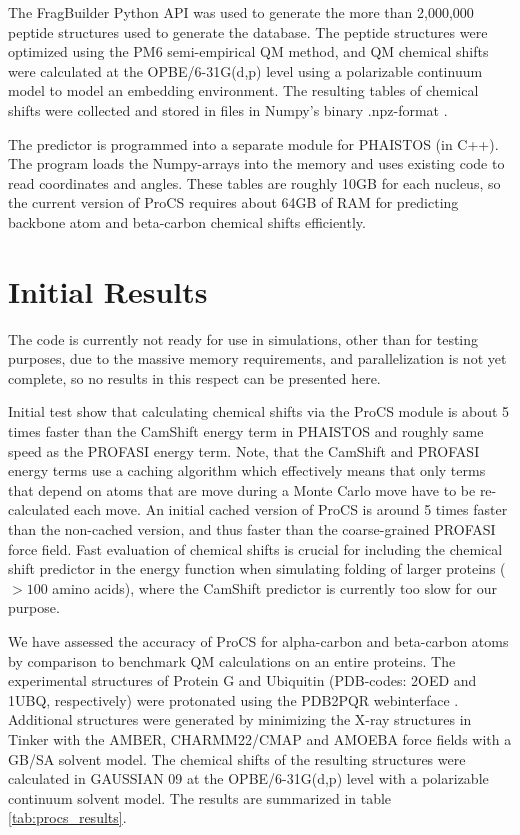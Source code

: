 The FragBuilder Python API was used to generate the more than 2,000,000 peptide structures used to generate the database.
The peptide structures were optimized using the PM6 semi-empirical QM method, and QM chemical shifts were calculated at the OPBE/6-31G(d,p) level using a polarizable continuum model to model an embedding environment.
The resulting tables of chemical shifts were collected and stored in files in Numpy's binary .npz-format \cite{numpy}.

The predictor is programmed into a separate module for PHAISTOS (in C++).
The program loads the Numpy-arrays into the memory and uses existing code to read coordinates and angles.
These tables are roughly 10GB for each nucleus, so the current version of ProCS requires about 64GB of RAM for predicting backbone atom and beta-carbon chemical shifts efficiently.


\section{Initial Results}
The code is currently not ready for use in simulations, other than for testing purposes, due to the massive memory requirements, and parallelization is not yet complete, so no results in this respect can be presented here.

Initial test show that calculating chemical shifts via the ProCS module is about 5 times faster than the CamShift energy term in PHAISTOS and roughly same speed as the PROFASI energy term.
Note, that the CamShift and PROFASI energy terms use a caching algorithm which effectively means that only terms that depend on atoms that are move during a Monte Carlo move have to be re-calculated each move.
An initial cached version of ProCS is around 5 times faster than the non-cached version, and thus faster than the coarse-grained PROFASI force field. Fast evaluation of chemical shifts is crucial for including the chemical shift predictor in the energy function when simulating folding of larger proteins ($>100$ amino acids), where the CamShift predictor is currently too slow for our purpose.

We have assessed the accuracy of ProCS for alpha-carbon and beta-carbon atoms by comparison to benchmark QM calculations on an entire proteins.
The experimental structures of Protein G and Ubiquitin (PDB-codes: 2OED and 1UBQ, respectively) were protonated using the PDB2PQR webinterface \cite{pdb2pqr1,pdb2pqr2}.
Additional structures were generated by minimizing the X-ray structures in Tinker with the AMBER, CHARMM22/CMAP and AMOEBA force fields with a GB/SA solvent model.
The chemical shifts of the resulting structures were calculated in GAUSSIAN 09 \cite{g09} at the OPBE/6-31G(d,p) level with a polarizable continuum solvent model. The results are summarized in table \ref{tab:procs_results}.

